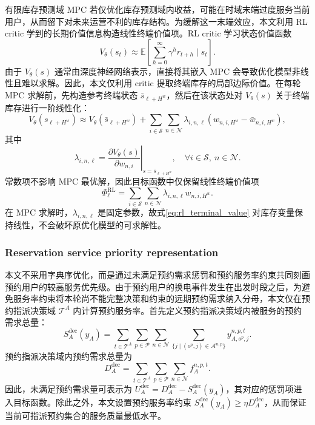 \documentclass[12pt,hyperref,a4paper,UTF8]{ctexart}
\begin{document}
有限库存预测域 MPC 若仅优化库存预测域内收益，可能在时域末端过度服务当前用户，从而留下对未来运营不利的库存结构。为缓解这一末端效应，本文利用 RL critic 学到的长期价值信息构造线性终端价值项。RL critic 学习状态价值函数
\begin{equation}
V_{\theta}(s_t)\approx
\mathbb{E}\left[\sum_{h=0}^{\infty}\gamma^h r_{t+h}\mid s_t\right].
\label{eq:critic_value}
\end{equation}
由于 $V_{\theta}(s)$ 通常由深度神经网络表示，直接将其嵌入 MPC 会导致优化模型非线性且难以求解。因此，本文仅利用 critic 提取终端库存的局部边际价值。在每轮 MPC 求解前，先构造参考终端状态 $\bar{s}_{\ell+H^w}$，然后在该状态处对 $V_{\theta}(s)$ 关于终端库存进行一阶线性化：
\begin{equation}
V_{\theta}(s_{\ell+H^w})
\approx
V_{\theta}(\bar{s}_{\ell+H^w})+
\sum_{i\in\mathcal{S}}\sum_{n\in\mathcal{N}}
\lambda_{i,n,\ell}\left(w_{n,i,H^w}-\bar{w}_{n,i,H^w}\right),
\label{eq:value_linearization}
\end{equation}
其中
\begin{equation}
\lambda_{i,n,\ell}
=
\left.
\frac{\partial V_{\theta}(s)}{\partial w_{n,i}}
\right|_{s=\bar{s}_{\ell+H^w}},
\quad \forall i\in\mathcal{S},\ n\in\mathcal{N}.
\label{eq:marginal_value}
\end{equation}
常数项不影响 MPC 最优解，因此目标函数中仅保留线性终端价值项
\begin{equation}
\Phi^{\mathrm{RL}}_{\ell}
=
\sum_{i\in\mathcal{S}}\sum_{n\in\mathcal{N}}
\lambda_{i,n,\ell}w_{n,i,H^w}.
\label{eq:rl_terminal_value}
\end{equation}
在 MPC 求解时，$\lambda_{i,n,\ell}$ 是固定参数，故式\eqref{eq:rl_terminal_value} 对库存变量保持线性，不会破坏原优化模型的可求解性。


\subsubsection{Reservation service priority representation}

本文不采用字典序优化，而是通过未满足预约需求惩罚和预约服务率约束共同刻画预约用户的较高服务优先级。由于预约用户的换电事件发生在出发时段之后，为避免服务率约束将本轮尚不能完整决策和约束的远期预约需求纳入分母，本文仅在预约指派决策域 $\mathcal{T}^{A}$ 内计算预约服务率。首先定义预约指派决策域内被服务的预约需求总量：
\begin{equation}
S_A^{\mathrm{dec}}(y_A)=
\sum_{t\in\mathcal{T}^{A}}\sum_{p\in\mathcal{P}}\sum_{n\in\mathcal{N}}
\sum_{\{j\mid (o^p,j)\in\mathcal{A}^{n,p}\}}
y_{A,o^p,j}^{n,p,t}.
\label{eq:served_reservation_total}
\end{equation}
预约指派决策域内预约需求总量为
\begin{equation}
D_A^{\mathrm{dec}}=
\sum_{t\in\mathcal{T}^{A}}\sum_{p\in\mathcal{P}}\sum_{n\in\mathcal{N}}
f_A^{n,p,t}.
\label{eq:reservation_total_demand}
\end{equation}
因此，未满足预约需求量可表示为 $U_A^{\mathrm{dec}}=D_A^{\mathrm{dec}}-S_A^{\mathrm{dec}}(y_A)$，其对应的惩罚项进入目标函数。除此之外，本文设置预约服务率约束 $S_A^{\mathrm{dec}}(y_A)\ge \eta D_A^{\mathrm{dec}}$，从而保证当前可指派预约集合的服务质量最低水平。
\end{document}
